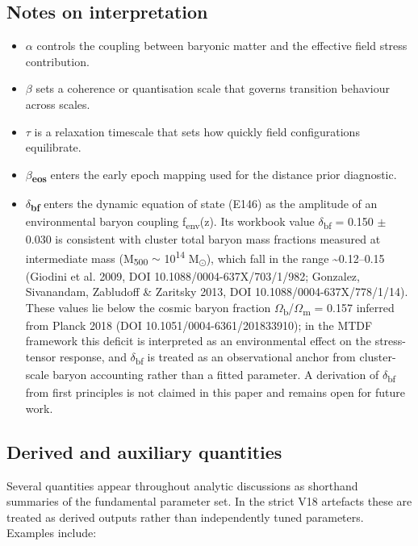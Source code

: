 \documentclass[11pt,a4paper]{article}
\begin{document}
\subsection{Notes on interpretation}
\begin{itemize}
  \item \textbf{$\alpha$} controls the coupling between baryonic matter and the effective field stress contribution.
  \item \textbf{$\beta$} sets a coherence or quantisation scale that governs transition behaviour across scales.
  \item \textbf{$\tau$} is a relaxation timescale that sets how quickly field configurations equilibrate.
  \item \textbf{$\beta$\textsubscript{eos}} enters the early epoch mapping used for the distance prior diagnostic.
  \item \textbf{$\delta$\textsubscript{bf}} enters the dynamic equation of state (E146) as the amplitude of an environmental baryon coupling f\textsubscript{env}(z). Its workbook value $\delta$\textsubscript{bf} = 0.150 $\pm$ 0.030 is consistent with cluster total baryon mass fractions measured at intermediate mass (M\textsubscript{500} $\sim$ 10\textsuperscript{14} M\textsubscript{$\odot$}), which fall in the range \~{}0.12--0.15 (Giodini et al. 2009, DOI 10.1088/\allowbreak{}0004-637X/\allowbreak{}703/\allowbreak{}1/\allowbreak{}982; Gonzalez, Sivanandam, Zabludoff \& Zaritsky 2013, DOI 10.1088/\allowbreak{}0004-637X/\allowbreak{}778/\allowbreak{}1/\allowbreak{}14). These values lie below the cosmic baryon fraction $\Omega$\textsubscript{b}/$\Omega$\textsubscript{m} = 0.157 inferred from Planck 2018 (DOI 10.1051/\allowbreak{}0004-6361/\allowbreak{}201833910); in the MTDF framework this deficit is interpreted as an environmental effect on the stress-tensor response, and $\delta$\textsubscript{bf} is treated as an observational anchor from cluster-scale baryon accounting rather than a fitted parameter. A derivation of $\delta$\textsubscript{bf} from first principles is not claimed in this paper and remains open for future work.
\end{itemize}

\subsection{Derived and auxiliary quantities}
Several quantities appear throughout analytic discussions as shorthand summaries of the fundamental parameter set. In the strict V18 artefacts these are treated as derived outputs rather than independently tuned parameters. Examples include:
\end{document}

